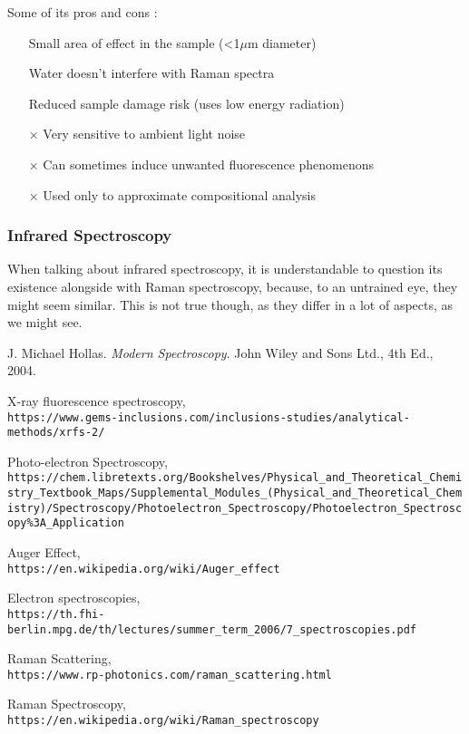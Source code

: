 \documentclass[]{article}
\begin{document}
Some of its pros and cons \cite{RM_Wiki}:
\begin{itemize}
\item[\checkmark] Small area of effect in the sample (<1$\mu$m diameter)
\item[\checkmark] Water doesn't interfere with Raman spectra
\item[\checkmark] Reduced sample damage risk (uses low energy radiation)
\item[$\times$] Very sensitive to ambient light noise
\item[$\times$] Can sometimes induce unwanted fluorescence phenomenons
\item[$\times$] Used only to approximate compositional analysis
\end{itemize}

\subsubsection{Infrared Spectroscopy} \label{IRS} %
When talking about infrared spectroscopy, it is understandable to question its existence alongside with Raman spectroscopy, because, to an untrained eye, they might seem similar. This is not true though, as they differ in a lot of aspects, as we might see.

\newpage

\begin{thebibliography}{9}
J. Michael Hollas. 
\textit{Modern Spectroscopy}. 
John Wiley and Sons Ltd., 4th Ed., 2004.

X-ray fluorescence spectroscopy,
\\\texttt{https://www.gems-inclusions.com/inclusions-studies/analytical-methods/xrfs-2/}

Photo-electron Spectroscopy,
\\\texttt{https://chem.libretexts.org/Bookshelves/Physical\_and\_Theoretical\_Chemistry\_Textbook\_Maps/Supplemental\_Modules\_(Physical\_and\_Theoretical\_Chemistry)/Spectroscopy/Photoelectron\_Spectroscopy/Photoelectron\_Spectroscopy\%3A\_Application}

Auger Effect,
\\\texttt{https://en.wikipedia.org/wiki/Auger\_effect}

Electron spectroscopies,
\\\texttt{https://th.fhi-berlin.mpg.de/th/lectures/summer\_term\_2006/7\_spectroscopies.pdf}

Raman Scattering,
\\\texttt{https://www.rp-photonics.com/raman\_scattering.html}

Raman Spectroscopy,
\\\texttt{https://en.wikipedia.org/wiki/Raman\_spectroscopy}

\end{thebibliography}
\end{document}
